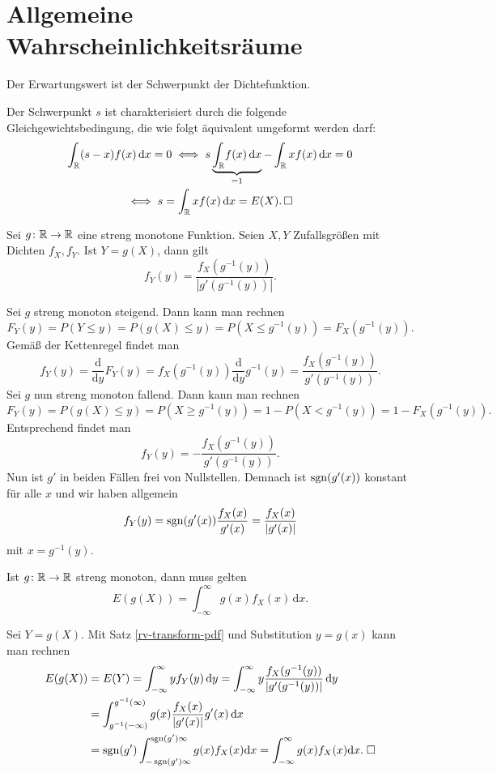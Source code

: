 \newpage
\section{Allgemeine Wahrscheinlichkeitsräume}

\begin{Korollar}
Der Erwartungswert ist der Schwerpunkt der Dichtefunktion.
\end{Korollar}
\begin{Beweis} Der Schwerpunkt $s$ ist charakterisiert durch die
folgende Gleichgewichtsbedingung, die wie folgt äquivalent
umgeformt werden darf:
\begin{gather*}
\int_\mathbb R (s-x)f(x)\,\mathrm dx = 0
\iff s\underbrace{\int_\mathbb R\! f(x)\,\mathrm dx}_{=1}
- \int_\mathbb R xf(x)\,\mathrm dx = 0\\
\iff s = \int_\mathbb R xf(x)\,\mathrm dx = E(X).\,\square
\end{gather*}
\end{Beweis}

\begin{Satz}\label{rv-transform-pdf}
Sei $g\colon\mathbb R\to\mathbb R$ eine streng monotone Funktion. Seien
$X,Y$ Zufallsgrößen mit Dichten $f_X,f_Y$. Ist $Y=g(X)$,
dann gilt
\[f_Y(y) = \frac{f_X(g^{-1}(y))}{|g'(g^{-1}(y))|}.\]
\end{Satz}
 Sei $g$ streng monoton steigend. Dann kann man rechnen
\[F_Y(y) = P(Y\le y) = P(g(X)\le y) = P(X\le g^{-1}(y)) = F_X(g^{-1}(y)).\]
Gemäß der Kettenregel findet man
\[f_Y(y) = \frac{\mathrm d}{\mathrm dy}F_Y(y)
= f_X(g^{-1}(y))\frac{\mathrm d}{\mathrm dy}g^{-1}(y) = \frac{f_X(g^{-1}(y))}{g'(g^{-1}(y))}.\]
Sei $g$ nun streng monoton fallend. Dann kann man rechnen
\[F_Y(y) = P(g(X)\le y) = P(X\ge g^{-1}(y)) = 1 - P(X < g^{-1}(y))
= 1 - F_X(g^{-1}(y)).\]
Entsprechend findet man
\[f_Y(y) = -\frac{f_X(g^{-1}(y))}{g'(g^{-1}(y))}.\]
Nun ist $g'$ in beiden Fällen frei von Nullstellen. Demnach ist
$\operatorname{sgn}(g'(x))$ konstant für alle $x$ und wir haben allgemein
\[f_Y(y) = \operatorname{sgn}(g'(x))\frac{f_X(x)}{g'(x)} = \frac{f_X(x)}{|g'(x)|}\]
mit $x=g^{-1}(y)$.\;\qedsymbol

\begin{Satz}\newlinefirst
Ist $g\colon\mathbb R\to\mathbb R$ streng monoton, dann muss gelten
\[E(g(X)) = \int_{-\infty}^\infty g(x)f_X(x)\,\mathrm dx.\]
\end{Satz}
 Sei $Y=g(X)$. Mit Satz \ref{rv-transform-pdf}
und Substitution $y=g(x)$ kann man rechnen
\begin{align*}
E(g(X)) &= E(Y) = \int_{-\infty}^\infty yf_Y(y)\,\mathrm dy
= \int_{-\infty}^\infty y\frac{f_X(g^{-1}(y))}{|g'(g^{-1}(y))|}\,\mathrm dy\\
&= \int_{g^{-1}(-\infty)}^{g^{-1}(\infty)} g(x)
\frac{f_X(x)}{|g'(x)|}g'(x)\,\mathrm dx\\
&= \operatorname{sgn}(g')\int_{-\operatorname{sgn}(g')\infty}^{\operatorname{sgn}(g')\infty}g(x) f_X(x)\mathrm dx
= \int_{-\infty}^\infty g(x) f_X(x)\mathrm dx.\;\square
\end{align*}

